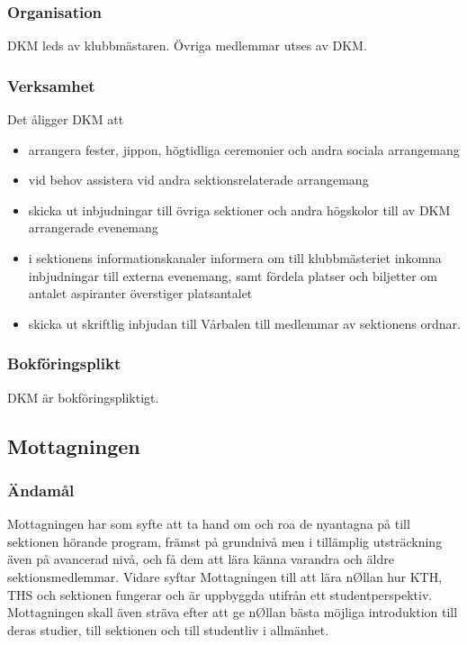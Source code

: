 \documentclass{dgovdoc}
\begin{document}
\subsubsection{Organisation}

DKM leds av klubbmästaren. Övriga medlemmar utses av DKM.

\subsubsection{Verksamhet}

Det åligger DKM att

\begin{itemize}
  \item arrangera fester, jippon, högtidliga ceremonier och andra sociala
    arrangemang
  \item vid behov assistera vid andra sektionsrelaterade arrangemang
  \item skicka ut inbjudningar till övriga sektioner och andra högskolor till
    av DKM arrangerade evenemang
  \item i sektionens informationskanaler informera om till klubbmästeriet
    inkomna inbjudningar till externa evenemang, samt fördela platser och
    biljetter om antalet aspiranter överstiger platsantalet
  \item skicka ut skriftlig inbjudan till Vårbalen till medlemmar av sektionens
    ordnar.
\end{itemize}

\subsubsection{Bokföringsplikt}

DKM är bokföringspliktigt.

\subsection{Mottagningen}

\subsubsection{Ändamål}

Mottagningen har som syfte att ta hand om och roa de nyantagna på till
sektionen hörande program, främst på grundnivå men i tillämplig utsträckning
även på avancerad nivå, och få dem att lära känna varandra och äldre
sektionsmedlemmar. Vidare syftar Mottagningen till att lära nØllan hur KTH, THS
och sektionen fungerar och är uppbyggda utifrån ett studentperspektiv.
Mottagningen skall även sträva efter att ge nØllan bästa möjliga introduktion
till deras studier, till sektionen och till studentliv i allmänhet.
\end{document}
